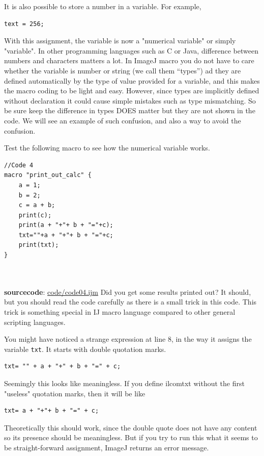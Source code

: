 \documentclass[11pt,a4paper,oneside]{report}
\newcommand{\ilcom}[1]{\texttt{\small#1}}
\begin{document}
It is also possible to store a number in a variable. For example, \\
\begin{lstlisting}[numbers=none]
text = 256;
\end{lstlisting}
With this assignment, the variable is now a "numerical variable" or simply "variable". 
In other programming languages such as C or Java, difference between numbers and characters matters a lot. 
In ImageJ macro you do not have to care whether the variable is number or string (we call them ``types'') ad they are defined automatically by the type of value provided for a variable, and this makes the macro coding to be light and easy. However, since types are implicitly defined without declaration it could cause simple mistakes such as type mismatching. 
So be sure keep the difference in types DOES matter but they are not shown in the code. We will see an example of such confusion, 
and also a way to avoid the confusion. 

Test the following macro to see how the numerical variable works. 

\begin{lstlisting}
//Code 4
macro "print_out_calc" {
	a = 1;
	b = 2;
	c = a + b;
	print(c);
	print(a + "+"+ b + "="+c);
	txt=""+a + "+"+ b + "="+c;
	print(txt);
}



\end{lstlisting}
\textbf{sourcecode}: \href{http://www.example.com/contents}{code/code04.ijm}
Did you get some results printed out? It should, but you should read the code carefully as there is a small trick in this code.  This trick is something special in IJ macro language compared to other general scripting languages. 

You might have noticed a strange expression at line 8, in the way it assigns the variable \ilcom{txt}. 
It starts with double quotation marks. \\
\begin{lstlisting}[numbers=none]
txt= "" + a + "+" + b + "=" + c;
\end{lstlisting}
Seemingly this looks like meaningless. 
If you define ilcom{txt} without the first "useless" quotation marks, then it will be like\\
\begin{lstlisting}[numbers=none]
txt= a + "+"+ b + "=" + c;
\end{lstlisting}
Theoretically this should work, 
since the double quote does not have any content so its presence should be meaningless. But if you try to run this what it seems to be straight-forward assignment, 
ImageJ returns an error message. 
\end{document}
